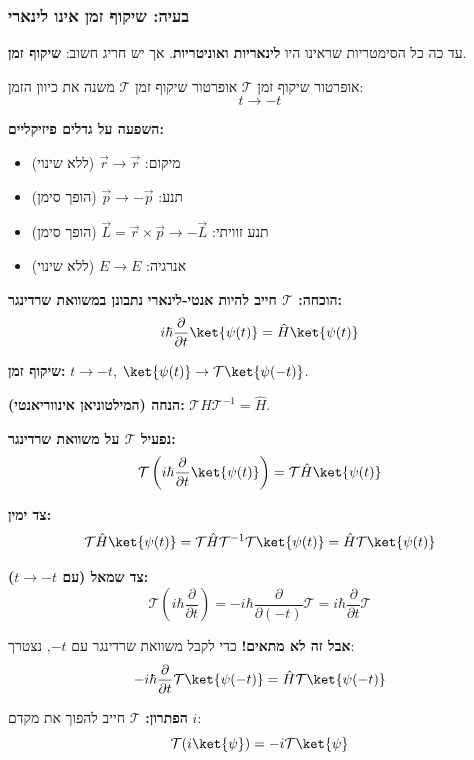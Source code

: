 \subsubsection{בעיה: שיקוף זמן אינו לינארי}

עד כה כל הסימטריות שראינו היו \textbf{לינאריות ואוניטריות}. אך יש חריג חשוב: \textbf{שיקוף זמן}.

\begin{definitionbox}{אופרטור שיקוף זמן $\mathcal{T}$}
אופרטור שיקוף זמן $\mathcal{T}$ משנה את כיוון הזמן:
\[
t \to -t
\]

\textbf{השפעה על גדלים פיזיקליים:}
\begin{itemize}
    \item מיקום: $\vec{r} \to \vec{r}$ (ללא שינוי)
    \item תנע: $\vec{p} \to -\vec{p}$ (הופך סימן)
    \item תנע זוויתי: $\vec{L} = \vec{r} \times \vec{p} \to -\vec{L}$ (הופך סימן)
    \item אנרגיה: $E \to E$ (ללא שינוי)
\end{itemize}
\end{definitionbox}

\textbf{הוכחה: $\mathcal{T}$ חייב להיות אנטי-לינארי}
\textbf{נתבונן במשוואת שרדינגר:}
\[
i\hbar \frac{\partial}{\partial t}\ket{\psi(t)} = \hat{H}\ket{\psi(t)}
\]

\textbf{שיקוף זמן:} $t \to -t$, $\ket{\psi(t)} \to \mathcal{T}\ket{\psi(-t)}$.

\textbf{הנחה (המילטוניאן אינווריאנטי):} $\mathcal{T}\hat{H}\mathcal{T}^{-1} = \hat{H}$.

\textbf{נפעיל $\mathcal{T}$ על משוואת שרדינגר:}
\[
\mathcal{T}\left(i\hbar \frac{\partial}{\partial t}\ket{\psi(t)}\right) = \mathcal{T}\hat{H}\ket{\psi(t)}
\]

\textbf{צד ימין:}
\[
\mathcal{T}\hat{H}\ket{\psi(t)} = \mathcal{T}\hat{H}\mathcal{T}^{-1}\mathcal{T}\ket{\psi(t)} = \hat{H}\mathcal{T}\ket{\psi(t)}
\]

\textbf{צד שמאל (עם $t \to -t$):}
\[
\mathcal{T}\left(i\hbar \frac{\partial}{\partial t}\right) = -i\hbar \frac{\partial}{\partial(-t)}\mathcal{T} = i\hbar\frac{\partial}{\partial t}\mathcal{T}
\]

\textbf{אבל זה לא מתאים!} כדי לקבל משוואת שרדינגר עם $-t$, נצטרך:
\[
-i\hbar\frac{\partial}{\partial t}\mathcal{T}\ket{\psi(-t)} = \hat{H}\mathcal{T}\ket{\psi(-t)}
\]

\textbf{הפתרון:} $\mathcal{T}$ חייב להפוך את מקדם $i$:
\[
\mathcal{T}(i\ket{\psi}) = -i\mathcal{T}\ket{\psi}
\]

